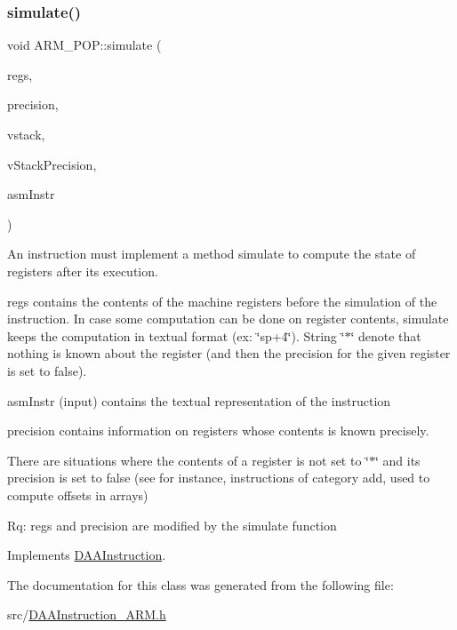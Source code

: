 \subsubsection{\texorpdfstring{simulate()}{simulate()}}
{\footnotesize\ttfamily void A\+R\+M\+\_\+\+P\+O\+P\+::simulate (\begin{DoxyParamCaption}\item[{\hyperlink{DAAInstruction_8h_af0fae93a861de9cf37988d5673cac523}{reg\+Table} \&}]{regs,  }\item[{\hyperlink{DAAInstruction_8h_a0e8cae02815a5f8adc750122d790b455}{reg\+Precision\+Table} \&}]{precision,  }\item[{\hyperlink{DAAInstruction_8h_a1b0e70ac1a04f06c8132055ed01f589f}{stack\+Type} \&}]{vstack,  }\item[{\hyperlink{DAAInstruction_8h_ac5cb793e9dac3fa9693da78b7e29ab30}{stack\+Prec\+Type} \&}]{v\+Stack\+Precision,  }\item[{const string \&}]{asm\+Instr }\end{DoxyParamCaption})\hspace{0.3cm}{\ttfamily [virtual]}}

An instruction must implement a method simulate to compute the state of registers after its execution.

regs contains the contents of the machine registers before the simulation of the instruction. In case some computation can be done on register contents, simulate keeps the computation in textual format (ex\+: \char`\"{}sp+4\char`\"{}). String \char`\"{}$\ast$\char`\"{} denote that nothing is known about the register (and then the precision for the given register is set to false).

asm\+Instr (input) contains the textual representation of the instruction

precision contains information on registers whose contents is known precisely.

There are situations where the contents of a register is not set to \char`\"{}$\ast$\char`\"{} and its precision is set to false (see for instance, instructions of category add, used to compute offsets in arrays)

Rq\+: regs and precision are modified by the simulate function 

Implements \hyperlink{classDAAInstruction_a61d0b9bece1e0ead89a46c0197276324}{D\+A\+A\+Instruction}.



The documentation for this class was generated from the following file\+:\begin{DoxyCompactItemize}
\item 
src/\hyperlink{DAAInstruction__ARM_8h}{D\+A\+A\+Instruction\+\_\+\+A\+R\+M.\+h}\end{DoxyCompactItemize}
